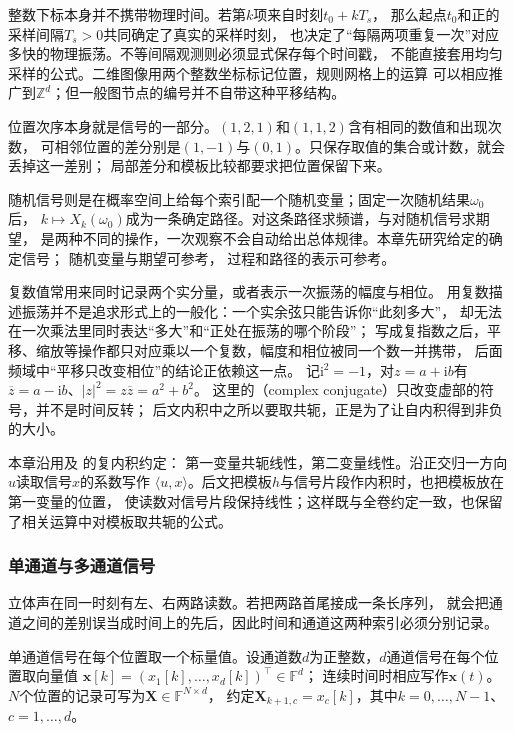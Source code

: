 整数下标本身并不携带物理时间。若第$k$项来自时刻$t_0+kT_s$，
那么起点$t_0$和正的采样间隔$T_s>0$共同确定了真实的采样时刻，
也决定了“每隔两项重复一次”对应多快的物理振荡。不等间隔观测则必须显式保存每个时间戳，
不能直接套用均匀采样的公式。二维图像用两个整数坐标标记位置，规则网格上的运算
可以相应推广到$\mathbb Z^d$；但一般图节点的编号并不自带这种平移结构。

位置次序本身就是信号的一部分。$(1,2,1)$和$(1,1,2)$含有相同的数值和出现次数，
可相邻位置的差分别是$(1,-1)$与$(0,1)$。只保存取值的集合或计数，就会丢掉这一差别；
局部差分和模板比较都要求把位置保留下来。

随机信号则是在概率空间上给每个索引配一个随机变量；固定一次随机结果$\omega_0$后，
$k\mapsto X_k(\omega_0)$成为一条确定路径。对这条路径求频谱，与对随机信号求期望，
是两种不同的操作，一次观察不会自动给出总体规律。本章先研究给定的确定信号；
随机变量与期望可参考，
过程和路径的表示可参考。

复数值常用来同时记录两个实分量，或者表示一次振荡的幅度与相位。
用复数描述振荡并不是追求形式上的一般化：一个实余弦只能告诉你“此刻多大”，
却无法在一次乘法里同时表达“多大”和“正处在振荡的哪个阶段”；
写成复指数之后，平移、缩放等操作都只对应乘以一个复数，幅度和相位被同一个数一并携带，
后面频域中“平移只改变相位”的结论正依赖这一点。
记$\mathrm i^2=-1$，对$z=a+\mathrm ib$有
$\overline z=a-\mathrm ib$、$|z|^2=z\overline z=a^2+b^2$。
这里的（complex conjugate）只改变虚部的符号，并不是时间反转；
后文内积中之所以要取共轭，正是为了让自内积得到非负的大小。

本章沿用及
的复内积约定：
第一变量共轭线性，第二变量线性。沿正交归一方向$u$读取信号$x$的系数写作
$\langle u,x\rangle$。后文把模板$h$与信号片段作内积时，也把模板放在第一变量的位置，
使读数对信号片段保持线性；这样既与全卷约定一致，也保留了相关运算中对模板取共轭的公式。

\subsubsection{单通道与多通道信号}

立体声在同一时刻有左、右两路读数。若把两路首尾接成一条长序列，
就会把通道之间的差别误当成时间上的先后，因此时间和通道这两种索引必须分别记录。
\begin{definition}[标量信号与向量值信号]
  \label{def:signal-multichannel}
  单通道信号在每个位置取一个标量值。设通道数$d$为正整数，$d$通道信号在每个位置取向量值
  $\bm x[k]=(x_1[k],\ldots,x_d[k])^\top\in\mathbb F^d$；
  连续时间时相应写作$\bm x(t)$。
  $N$个位置的记录可写为$\bm X\in\mathbb F^{N\times d}$，
  约定$\bm X_{k+1,c}=x_c[k]$，其中$k=0,\ldots,N-1$、$c=1,\ldots,d$。
\end{definition}

